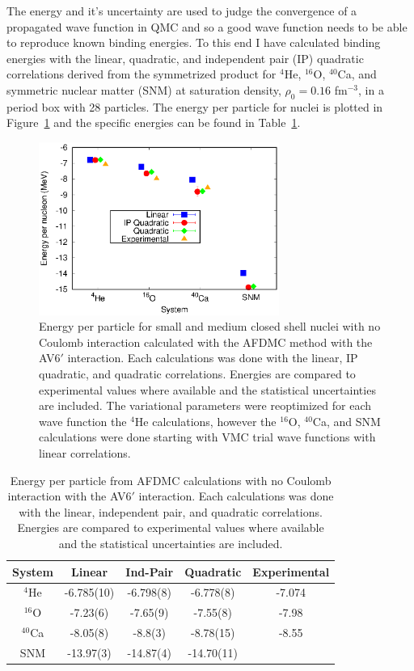 The energy and it's uncertainty are used to judge the convergence of a propagated wave function in QMC and so a good wave function needs to be able to reproduce known binding energies. To this end I have calculated binding energies with the linear, quadratic, and independent pair (IP) quadratic correlations derived from the symmetrized product for $^4$He, $^{16}$O, $^{40}$Ca, and symmetric nuclear matter (SNM) at saturation density, $\rho_0=0.16$ fm$^{-3}$, in a period box with 28 particles. The energy per particle for nuclei is plotted in Figure~\ref{fig:energies} and the specific energies can be found in Table~\ref{tab:energies}.
\begin{figure}[h!]
   \centering
   \includegraphics[width=0.7\textwidth]{figures/energy.eps}
   \caption{Energy per particle for small and medium closed shell nuclei with no Coulomb interaction calculated with the AFDMC method with the AV6$'$ interaction. Each calculations was done with the linear, IP quadratic, and quadratic correlations. Energies are compared to experimental values where available and the statistical uncertainties are included. The variational parameters were reoptimized for each wave function the $^4$He calculations, however the $^{16}$O, $^{40}$Ca, and SNM calculations were done starting with VMC trial wave functions with linear correlations.}
   \label{fig:energies}
\end{figure}
\begin{table}[htb]
   \centering
   \begin{tabular}{ccccc}
      \hline\hline
      System & Linear & Ind-Pair & Quadratic & Experimental \\
      \hline
      $^4${He}    & -6.785(10)   & -6.798(8) & -6.778(8)    & -7.074 \\   
      $^{16}${O}  & -7.23(6)     & -7.65(9)  & -7.55(8)     & -7.98  \\   
      $^{40}${Ca} & -8.05(8)     & -8.8(3)   & -8.78(15)    & -8.55  \\
      SNM         & -13.97(3)    & -14.87(4) & -14.70(11)   &        \\
      \hline\hline
   \end{tabular}
   \caption{Energy per particle from AFDMC calculations with no Coulomb interaction with the AV6$'$ interaction. Each calculations was done with the linear, independent pair, and quadratic correlations. Energies are compared to experimental values where available and the statistical uncertainties are included.}
   \label{tab:energies}
\end{table}
